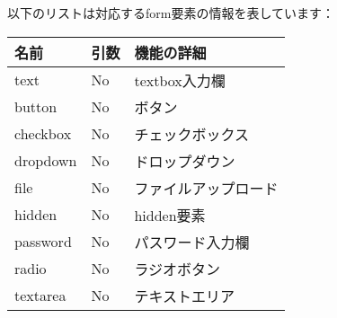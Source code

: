 以下のリストは対応するform要素の情報を表しています：

\begin{tabular}{|l|l|l|} \hline
名前 & 引数 & 機能の詳細 \\ \hline
text &	No &	textbox入力欄 \\ \hline
button &	No &	ボタン \\ \hline
checkbox &	No &	チェックボックス \\ \hline
dropdown &	No &	ドロップダウン \\ \hline
file &	No &	ファイルアップロード \\ \hline
hidden &	No &	hidden要素 \\ \hline
password &	No &	パスワード入力欄 \\ \hline
radio &	No &	ラジオボタン \\ \hline
textarea &	No &	テキストエリア \\ \hline
\end{tabular}
